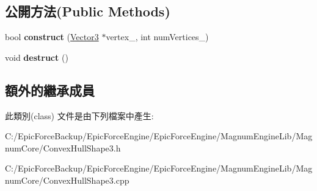 \subsection*{公開方法(Public Methods)}
\begin{DoxyCompactItemize}
\item 
bool {\bfseries construct} (\hyperlink{class_magnum_1_1_vector3}{Vector3} $\ast$vertex\+\_\+, int num\+Vertices\+\_\+)\hypertarget{class_magnum_1_1_convex_hull_shape3_aaecc70e571d683c3f08fffe43a99a873}{}\label{class_magnum_1_1_convex_hull_shape3_aaecc70e571d683c3f08fffe43a99a873}

\item 
void {\bfseries destruct} ()\hypertarget{class_magnum_1_1_convex_hull_shape3_afb7c859a2b04dbf78835855f86dcf59a}{}\label{class_magnum_1_1_convex_hull_shape3_afb7c859a2b04dbf78835855f86dcf59a}

\end{DoxyCompactItemize}
\subsection*{額外的繼承成員}


此類別(class) 文件是由下列檔案中產生\+:\begin{DoxyCompactItemize}
\item 
C\+:/\+Epic\+Force\+Backup/\+Epic\+Force\+Engine/\+Epic\+Force\+Engine/\+Magnum\+Engine\+Lib/\+Magnum\+Core/Convex\+Hull\+Shape3.\+h\item 
C\+:/\+Epic\+Force\+Backup/\+Epic\+Force\+Engine/\+Epic\+Force\+Engine/\+Magnum\+Engine\+Lib/\+Magnum\+Core/Convex\+Hull\+Shape3.\+cpp\end{DoxyCompactItemize}
